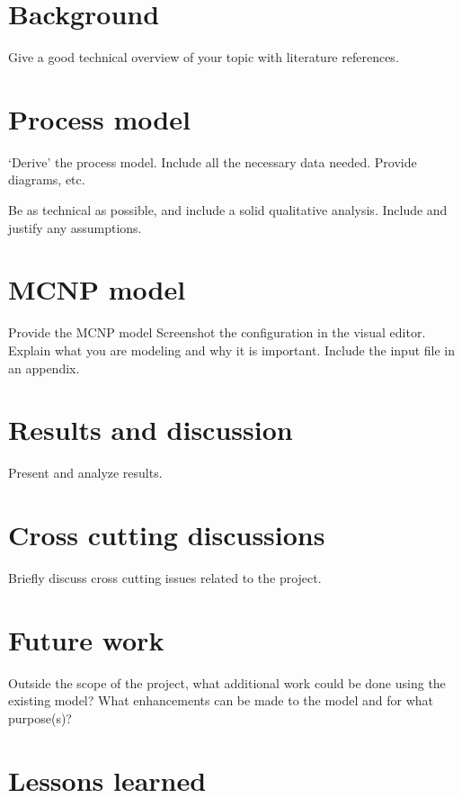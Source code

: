 \documentclass[11pt,a4paper]{article} \usepackage[lmargin=1in,rmargin=1in,tmargin=1in,bmargin=1in]{geometry} \usepackage[pagewise]{lineno} %
\begin{document}
\section{Background} \label{background}
Give a good technical overview of your topic with literature references.

\newpage

\section{Process model} \label{process-model}
`Derive' the process model. Include all the necessary data needed. Provide diagrams, etc.

Be as technical as possible, and include a solid qualitative analysis. Include and justify any assumptions.

\newpage

\section{MCNP model} \label{mcnp-model}
Provide the MCNP model Screenshot the configuration in the visual editor. Explain what you are modeling and why it is important. Include the input file in an appendix.

\newpage

\section{Results and discussion} \label{results-discussion}
Present and analyze results.

\newpage

\section{Cross cutting discussions} \label{cross-cutting}
Briefly discuss cross cutting issues related to the project.

\newpage

\section{Future work} \label{future-work}
Outside the scope of the project, what additional work could be done using the existing model? What enhancements can be made to the model and for what purpose(s)?

\newpage

\section{Lessons learned} \label{lessons-learned}
\end{document}
